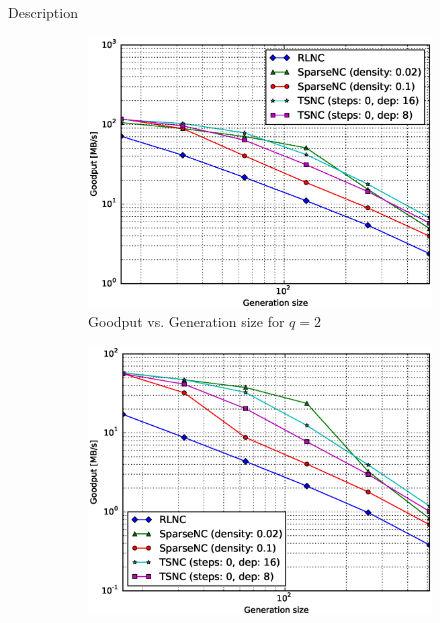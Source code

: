 Description

\begin{figure}
    \centering
    \begin{subfigure}[b]{0.475\textwidth}
        \centering
        \includegraphics[width=1.15\textwidth]{images/23_07_2015/goodput_vs_generation_size_Rasp_v2_decoder_Binary_1600.eps}
        \caption[]%
        {{\small Goodput vs. Generation size for $q = 2$}}    
        \label{fig:dec_good_rasp2_gen_gf2}
    \end{subfigure}
    \hfill
    \begin{subfigure}[b]{0.475\textwidth}  
        \centering 
        \includegraphics[width=1.15\textwidth]{images/23_07_2015/goodput_vs_generation_size_Rasp_v2_decoder_Binary8_1600.eps}

\end{subfigure}
\end{figure}
